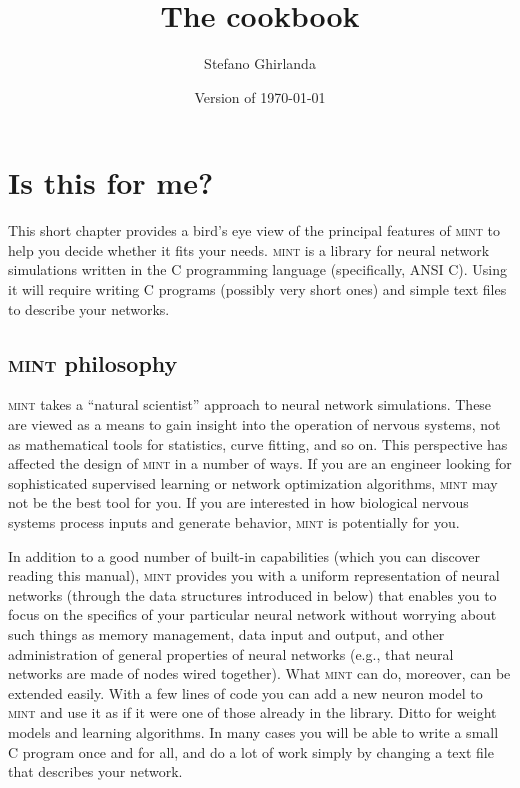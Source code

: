 \documentclass[11pt,letterpaper]{memoir}
\title{\bfseries The \mint cookbook}
\author{Stefano Ghirlanda}
\date{\footnotesize Version \mintversion of \today}
\let\fref\relax%
\newcommand{\mint}{{\scshape\sffamily mint}\xspace}
\begin{document}
\pagestyle{plain}

\maketitle

\renewcommand{\printtoctitle}[1]{%
  \large\bfseries\contentsname}
\renewcommand{\cftsectionfont}{}
\renewcommand{\cftsectionpagefont}{}
\renewcommand{\cftchapterfont}{}
\renewcommand{\cftchapterpagefont}{}
\tableofcontents*

\renewcommand{\foottextfont}{\sffamily\footnotesize}

\renewcommand{\thepage}{\sffamily\arabic{page}}

\clearpage

\chapter{Is this for me?}
\label{chap:intro}

This short chapter provides a bird's eye view of the principal
features of \mint to help you decide whether it fits your needs.
\mint is a library for neural network simulations written in the C
programming language (specifically, ANSI C). Using it will require
writing C programs (possibly very short ones) and simple text files to
describe your networks.

\section{\mint philosophy}
\label{sec:mint-philosophy}

\mint takes a ``natural scientist'' approach to neural network
simulations. These are viewed as a means to gain insight into the
operation of nervous systems, not as mathematical tools for
statistics, curve fitting, and so on. This perspective has affected
the design of \mint in a number of ways. If you are an engineer
looking for sophisticated supervised learning or network optimization
algorithms, \mint may not be the best tool for you.  If you are
interested in how biological nervous systems process inputs and
generate behavior, \mint is potentially for you.

In addition to a good number of built-in capabilities (which you can
discover reading this manual), \mint provides you with a uniform
representation of neural networks (through the data structures
introduced in \fref{sec:the-very-basics} below) that enables you to
focus on the specifics of your particular neural network without
worrying about such things as memory management, data input and
output, and other administration of general properties of neural
networks (e.g., that neural networks are made of nodes wired
together). What \mint can do, moreover, can be extended easily.  With
a few lines of code you can add a new neuron model to \mint and use it
as if it were one of those already in the library. Ditto for weight
models and learning algorithms. In many cases you will be able to
write a small C program once and for all, and do a lot of work simply
by changing a text file that describes your network.
\end{document}
